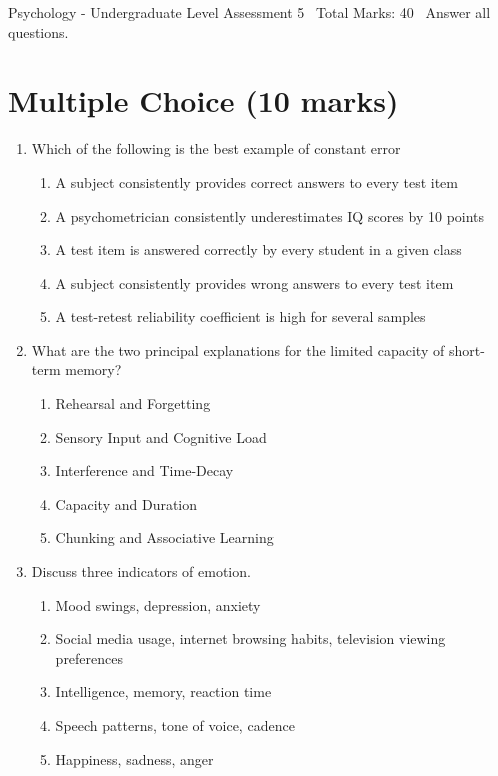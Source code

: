 \documentclass[12pt]{article}
\begin{document}
\begin{center}
Psychology - Undergraduate Level Assessment 5 \
Total Marks: 40 \
Answer all questions.
\end{center}

\section*{Multiple Choice (10 marks)}
\begin{enumerate}[label=\arabic*.]
\item Which of the following is the best example of constant error
\begin{enumerate}[label=(\alph*)]
    \item A subject consistently provides correct answers to every test item
    \item A psychometrician consistently underestimates IQ scores by 10 points
    \item A test item is answered correctly by every student in a given class
    \item A subject consistently provides wrong answers to every test item
    \item A test-retest reliability coefficient is high for several samples
\end{enumerate}
\item What are the two principal explanations for the limited capacity of short-term memory?
\begin{enumerate}[label=(\alph*)]
    \item Rehearsal and Forgetting
    \item Sensory Input and Cognitive Load
    \item Interference and Time-Decay
    \item Capacity and Duration
    \item Chunking and Associative Learning
\end{enumerate}
\item Discuss three indicators of emotion.
\begin{enumerate}[label=(\alph*)]
    \item Mood swings, depression, anxiety
    \item Social media usage, internet browsing habits, television viewing preferences
    \item Intelligence, memory, reaction time
    \item Speech patterns, tone of voice, cadence
    \item Happiness, sadness, anger

\end{enumerate}
\end{enumerate}
\end{document}
